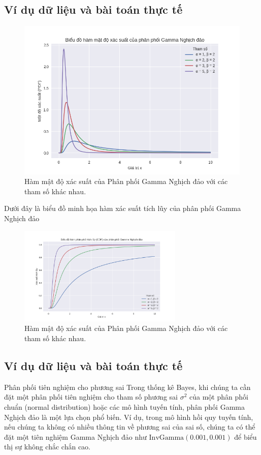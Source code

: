 	\subsection{Ví dụ dữ liệu và bài toán thực tế}
	\begin{figure}
		\centering
		\includegraphics[width=0.7\tetextwidth]{images/Inverse Gamma Distribution-PDF.png}
		\caption{Hàm mật độ xác suất của Phân phối Gamma Nghịch đảo với các tham số khác nhau.}
		\label{fig:Inverse Gamma Distribution-PDF}
	\end{figure}
	
	Dưới đây là biểu đồ minh họa hàm xác suất tích lũy của phân phối Gamma Nghịch đảo
	
		\begin{figure}[h!]
		\centering
		\includegraphics[width=0.7\textwidth]{images/Inverse Gamma Distribution-CDF.png} %
		\caption{Hàm mật độ xác suất của Phân phối Gamma Nghịch đảo với các tham số khác nhau.}
		\label{fig:Inverse Gamma Distribution-CDF}
	\end{figure}
	
	\subsection{Ví dụ dữ liệu và bài toán thực tế}
		Phân phối tiên nghiệm cho phương sai
		Trong thống kê Bayes, khi chúng ta cần đặt một phân phối tiên nghiệm cho tham số phương sai $\sigma^2$ của một phân phối chuẩn (normal distribution) hoặc các mô hình tuyến tính, phân phối Gamma Nghịch đảo là một lựa chọn phổ biến. Ví dụ, trong mô hình hồi quy tuyến tính, nếu chúng ta không có nhiều thông tin về phương sai của sai số, chúng ta có thể đặt một tiên nghiệm Gamma Nghịch đảo như $\text{InvGamma}(0.001, 0.001)$ để biểu thị sự không chắc chắn cao.
	
